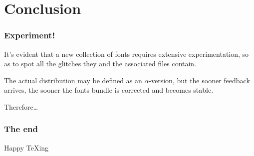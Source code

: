 \documentclass{beamer}
\begin{document}
\section{Conclusion}

\begin{frame}\frametitle{Experiment!}
It's evident that a new collection of fonts requires extensive experimentation, so as to spot all the glitches they and the associated files contain.

\medskip

The actual distribution may be defined as an $\alpha$-version, but the sooner feedback arrives, the sooner the fonts bundle is corrected and becomes stable.

\medskip

Therefore\dots
\end{frame}

\begin{frame}\frametitle{The end}
\begin{center}
\fontsize{37}{35}\selectfont Happy TeXing\\ 

\end{center}
\end{frame}
\end{document}
